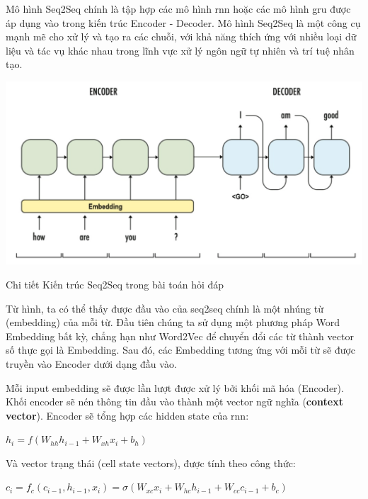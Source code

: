 \documentclass[a4paper, 12pt, openany]{book}
\begin{document}
\vspace{0.5cm}

Mô hình Seq2Seq chính là tập hợp các mô hình \ac{rnn} hoặc các mô hình \ac{gru} được áp dụng vào trong kiến trúc Encoder - Decoder. Mô hình Seq2Seq 
là một công cụ mạnh mẽ cho xử lý và tạo ra các chuỗi, với khả năng thích ứng với nhiều loại dữ liệu và tác vụ khác nhau trong lĩnh vực xử lý ngôn ngữ tự nhiên và trí tuệ nhân tạo.

\begin{minipage}{\linewidth}
    \captionsetup{type=figure}
    \centering
    \includegraphics[width=\linewidth]{./assets/images/seq2seq2.png}
    \caption{Chi tiết Kiến trúc Seq2Seq trong bài toán hỏi đáp}
\end{minipage}
\vspace{0.5cm}

Từ hình, ta có thể thấy được đầu vào của \ac{seq2seq} chính là một nhúng từ (embedding) của mỗi từ.
Đầu tiên chúng ta sử dụng
một phương pháp Word Embedding bất kỳ, chẳng hạn như Word2Vec để chuyển
đổi các từ thành vector số thực gọi là Embedding. Sau đó, các Embedding tương ứng với
mỗi từ sẽ được truyền vào Encoder dưới dạng đầu vào.

Mỗi input embedding sẽ được lần lượt được xử lý bởi khối mã hóa (Encoder).
Khối encoder sẽ nén thông tin đầu vào thành một vector ngữ nghĩa (\textbf{context vector}). Encoder sẽ tổng hợp các hidden state của \ac{rnn}:

\begin{center}
    \(h_i = f(W_{hh}h_{i-1} + W_{xh}x_i + b_h)\)
\end{center}

Và vector trạng thái (cell state vectors), được tính theo công thức: 

\begin{center}
    \(c_i = f_c(c_{i-1}, h_{i-1}, x_i) = \sigma(W_{xc}x_i + W_{hc}h_{i-1} + W_{cc}c_{i-1} + b_c)\)
\end{center}
\end{document}
